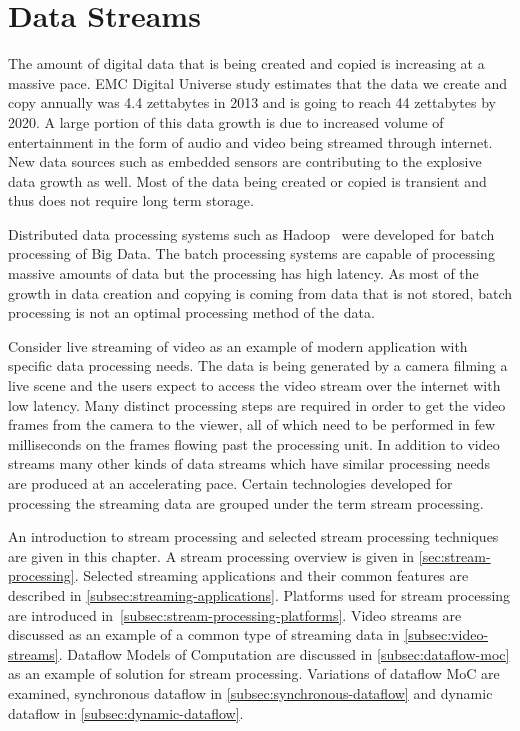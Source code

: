 \chapter{Data Streams}
\label{chapter:streams}
The amount of digital data that is being created and copied is increasing at a massive pace. EMC Digital Universe study \cite{turner2014digital} estimates that the data we create and copy annually was 4.4 zettabytes in 2013 and is going to reach 44 zettabytes by 2020. A large portion of this data growth is due to increased volume of entertainment in the form of audio and video being streamed through internet. New data sources such as embedded sensors are contributing to the explosive data growth as well. Most of the data being created or copied is transient and thus does not require long term storage.~\cite{turner2014digital}

Distributed data processing systems such as Hadoop~\cite{white2012hadoop} were developed for batch processing of Big Data. The batch processing systems are capable of processing massive amounts of data but the processing has high latency. As most of the growth in data creation and copying is coming from data that is not stored, batch processing is not an optimal processing method of the data.

Consider live streaming of video as an example of modern application with specific data processing needs. The data is being generated by a camera filming a live scene and the users expect to access the video stream over the internet with low latency. Many distinct processing steps are required in order to get the video frames from the camera to the viewer, all of which need to be performed in few milliseconds on the frames flowing past the processing unit. In addition to video streams many other kinds of data streams which have similar processing needs are produced at an accelerating pace. Certain technologies developed for processing the streaming data are grouped under the term stream processing.

An introduction to stream processing and selected stream processing techniques are given in this chapter. A stream processing overview is given in \ref{sec:stream-processing}. Selected streaming applications and their common features are described in \ref{subsec:streaming-applications}. Platforms used for stream processing are introduced in~\ref{subsec:stream-processing-platforms}. Video streams are discussed as an example of a common type of streaming data in \ref{subsec:video-streams}. Dataflow Models of Computation are discussed in \ref{subsec:dataflow-moc} as an example of solution for stream processing. Variations of dataflow MoC are examined, synchronous dataflow in \ref{subsec:synchronous-dataflow} and dynamic dataflow in \ref{subsec:dynamic-dataflow}.

